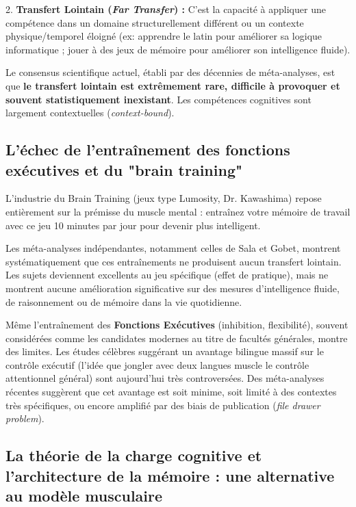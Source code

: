 2. \textbf{Transfert Lointain (\textit{Far Transfer}) :} C'est la capacité à appliquer une
compétence dans un domaine structurellement différent ou un contexte physique/temporel éloigné (ex:
apprendre le latin pour améliorer sa logique informatique ; jouer à des jeux de mémoire pour
améliorer son intelligence fluide).

Le consensus scientifique actuel, établi par des décennies de méta-analyses, est que \textbf{le
transfert lointain est extrêmement rare, difficile à provoquer et souvent statistiquement
inexistant}.\cite{II-1-1-ref15} Les compétences cognitives sont largement contextuelles
(\textit{context-bound}).



\subsection{L'échec de l'entraînement des fonctions exécutives et du "brain training"}

L'industrie du \og Brain Training\fg{} (jeux type Lumosity, Dr. Kawashima) repose entièrement sur la
prémisse du muscle mental : \og entraînez votre mémoire de travail avec ce jeu 10 minutes par jour
pour devenir plus intelligent\fg{}.

Les méta-analyses indépendantes, notamment celles de Sala et Gobet, montrent systématiquement que
ces entraînements ne produisent aucun transfert lointain. Les sujets deviennent excellents au jeu
spécifique (effet de pratique), mais ne montrent aucune amélioration significative sur des mesures
d'intelligence fluide, de raisonnement ou de mémoire dans la vie quotidienne.\cite{II-1-1-ref37}

Même l'entraînement des \textbf{Fonctions Exécutives} (inhibition, flexibilité), souvent considérées
comme les candidates modernes au titre de \og facultés générales\fg{}, montre des limites. Les
études célèbres suggérant un \og avantage bilingue\fg{} massif sur le contrôle exécutif (l'idée que
jongler avec deux langues muscle le contrôle attentionnel général) sont aujourd'hui très
controversées. Des méta-analyses récentes suggèrent que cet avantage est soit minime, soit limité à
des contextes très spécifiques, ou encore amplifié par des biais de publication (\textit{file drawer
problem}).\cite{II-1-1-ref26}



\subsection{La théorie de la charge cognitive et l'architecture de la mémoire : une alternative au modèle musculaire}

